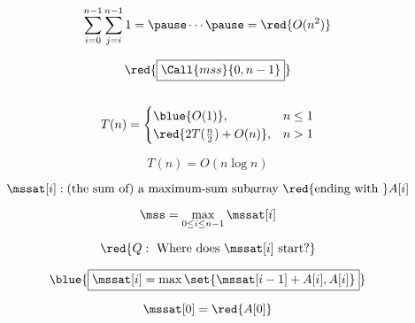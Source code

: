\begin{frame}
  \begin{columns}
      \begin{center}
        
      \end{center}
  \end{columns}

  \pause
  \vspace{0.60cm}
  \[
    \sum_{i=0}^{n-1} \sum_{j=i}^{n-1} 1 = \pause \cdots \pause = \red{O(n^2)}
  \]
\end{frame}

\begin{frame}
  \[
    \red{\boxed{\Call{mss}{0, n-1}}}
  \]

  \begin{columns}
      
  \end{columns}
\end{frame}

\begin{frame}
  \begin{columns}
      
  \end{columns}
\end{frame}

\begin{frame}

  \pause
  \vspace{0.60cm}
  \[
    T(n) = \begin{cases}
      \blue{O(1)}, & n \le 1 \\
      \red{2T(\frac{n}{2}) + O(n)}, & n > 1
    \end{cases}
  \]

  \pause
  \vspace{0.50cm}
  \[
    T(n) = O(n \log n)
  \]
\end{frame}

\begin{frame}{}
  \[
    \mssat[i]: \text{(the sum of) a maximum-sum subarray \red{ending with }} A[i]
  \]

  \pause
  \[
    \mss = \max_{0 \le i \le n-1} \mssat[i]
  \]

  \pause
  \[
    \red{Q: \text{ Where does } \mssat[i] \text{ start}?}
  \]

  \pause
  \[
    \blue{\boxed{\mssat[i] = \max \set{\mssat[i-1] + A[i], A[i]}}}
  \]

  \pause
  \[
    \mssat[0] = \red{A[0]}
  \]
\end{frame}

